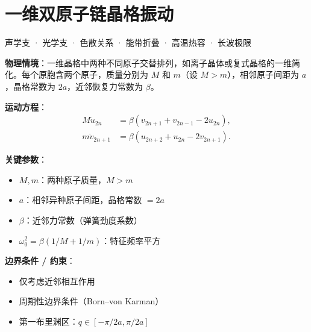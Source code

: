 
\section{一维双原子链晶格振动}
\label{sec:1d-diatomic-chain}

\begin{tipbox}[关键词标签]
声学支 · 光学支 · 色散关系 · 能带折叠 · 高温热容 · 长波极限
\end{tipbox}

\begin{modelbox}[模型：一维双原子链]
\textbf{物理情境}：一维晶格中两种不同原子交替排列，如离子晶体或复式晶格的一维简化。每个原胞含两个原子，质量分别为 $M$ 和 $m$（设 $M>m$），相邻原子间距为 $a$，晶格常数为 $2a$，近邻恢复力常数为 $\beta$。

\textbf{运动方程}：
\begin{align*}
M\ddot{u}_{2n} &= \beta(v_{2n+1}+v_{2n-1}-2u_{2n}),\\
m\ddot{v}_{2n+1} &= \beta(u_{2n+2}+u_{2n}-2v_{2n+1}).
\end{align*}

\textbf{关键参数}：
\begin{itemize}[nosep]
    \item $M, m$：两种原子质量，$M>m$
    \item $a$：相邻异种原子间距，晶格常数 $=2a$
    \item $\beta$：近邻力常数（弹簧劲度系数）
    \item $\omega_0^2 = \beta(1/M+1/m)$：特征频率平方
\end{itemize}

\textbf{边界条件 / 约束}：
\begin{itemize}[nosep]
    \item 仅考虑近邻相互作用
    \item 周期性边界条件（Born--von Karman）
    \item 第一布里渊区：$q\in[-\pi/2a, \pi/2a]$
\end{itemize}
\end{modelbox}

